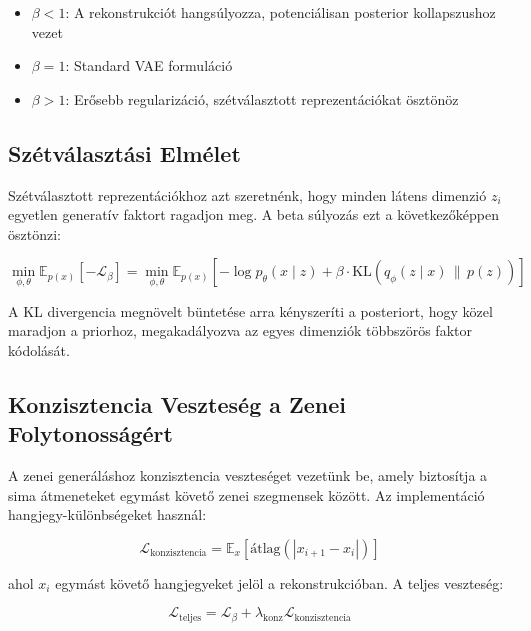 \begin{itemize}
    \item $\beta < 1$: A rekonstrukciót hangsúlyozza, potenciálisan posterior kollapszushoz vezet
    \item $\beta = 1$: Standard VAE formuláció
    \item $\beta > 1$: Erősebb regularizáció, szétválasztott reprezentációkat ösztönöz
\end{itemize}

\subsection{Szétválasztási Elmélet}

Szétválasztott reprezentációkhoz azt szeretnénk, hogy minden látens dimenzió $z_i$ egyetlen generatív faktort ragadjon meg. A beta súlyozás ezt a következőképpen ösztönzi:

\begin{equation}
\min_{\phi, \theta} \mathbb{E}_{p(x)}[-\mathcal{L}_{\beta}] = \min_{\phi, \theta} \mathbb{E}_{p(x)}[-\log p_\theta(x \mid z) + \beta \cdot \text{KL}(q_\phi(z \mid x) \, \| \, p(z))]
\end{equation}

A KL divergencia megnövelt büntetése arra kényszeríti a posteriort, hogy közel maradjon a priorhoz, megakadályozva az egyes dimenziók többszörös faktor kódolását.

\subsection{Konzisztencia Veszteség a Zenei Folytonosságért}

A zenei generáláshoz konzisztencia veszteséget vezetünk be, amely biztosítja a sima átmeneteket egymást követő zenei szegmensek között. Az implementáció hangjegy-különbségeket használ:

\begin{equation}
\mathcal{L}_{\text{konzisztencia}} = \mathbb{E}_{x} \left[ \text{átlag}(|x_{i+1} - x_i|) \right]
\end{equation}

ahol $x_i$ egymást követő hangjegyeket jelöl a rekonstrukcióban. A teljes veszteség:

\begin{equation}
\mathcal{L}_{\text{teljes}} = \mathcal{L}_{\beta} + \lambda_{\text{konz}} \mathcal{L}_{\text{konzisztencia}}
\end{equation}

